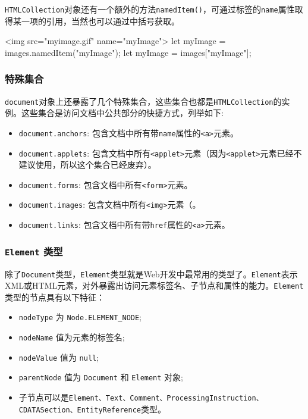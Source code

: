 \texttt{HTMLCollection}对象还有一个额外的方法\texttt{namedItem()}，可通过标签的\texttt{name}属性取得某一项的引用，当然也可以通过中括号获取。

\begin{JavaScript}
<img src="myimage.gif" name="myImage"> 
let myImage = images.namedItem("myImage"); 
let myImage = images["myImage"]; 
\end{JavaScript}

\subsubsection*{特殊集合}

\texttt{document}对象上还暴露了几个特殊集合，这些集合也都是\texttt{HTMLCollection}的实例。这些集合是访问文档中公共部分的快捷方式，列举如下:

\begin{itemize}
    \item \texttt{document.anchors}: 包含文档中所有带\texttt{name}属性的\texttt{<a>}元素。
    \item \texttt{document.applets}: 包含文档中所有\texttt{<applet>}元素（因为\texttt{<applet>}元素已经不建议使用，所以这个集合已经废弃）。
    \item \texttt{document.forms}: 包含文档中所有\texttt{<form>}元素。
    \item \texttt{document.images}: 包含文档中所有\texttt{<img>}元素（。
    \item \texttt{document.links}: 包含文档中所有带\texttt{href}属性的\texttt{<a>}元素。
\end{itemize}

\subsubsection{\texttt{Element} 类型}

除了\texttt{Document}类型，\texttt{Element}类型就是Web开发中最常用的类型了。\texttt{Element}表示XML或HTML元素，对外暴露出访问元素标签名、子节点和属性的能力。\texttt{Element}类型的节点具有以下特征：

\begin{itemize}
    \item \texttt{nodeType} 为 \texttt{Node.ELEMENT\_NODE};
    \item \texttt{nodeName} 值为元素的标签名;
    \item \texttt{nodeValue} 值为 \texttt{null};
    \item \texttt{parentNode} 值为 \texttt{Document} 和 \texttt{Element} 对象;
    \item 子节点可以是\texttt{Element、Text、Comment、ProcessingInstruction、CDATASection、EntityReference}类型。
\end{itemize}

